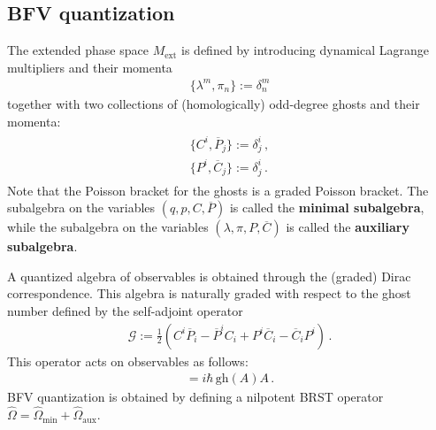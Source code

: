 \subsection{BFV quantization}

    The extended phase space $M_{\text{ext}}$ is defined by introducing dynamical Lagrange multipliers and their momenta
    \begin{gather}
        \{\lambda^m,\pi_n\} := \delta^m_n
    \end{gather}
    together with two collections of (homologically) odd-degree ghosts and their momenta:
    \begin{gather}
        \begin{aligned}
            \{C^i,\overline{P}_j\} := \delta^i_j\,,\\
            \{P^i,\overline{C}_j\} := \delta^i_j\,.
        \end{aligned}
    \end{gather}
    Note that the Poisson bracket for the ghosts is a graded Poisson bracket. The subalgebra on the variables $(q,p,C,\overline{P})$ is called the \textbf{minimal subalgebra}, while the subalgebra on the variables $(\lambda,\pi,P,\overline{C})$ is called the \textbf{auxiliary subalgebra}.

    A quantized algebra of observables is obtained through the (graded) Dirac correspondence. This algebra is naturally graded with respect to the ghost number defined by the self-adjoint operator
    \begin{gather}
        \mathcal{G} := \frac{1}{2}\left(C^i\overline{P}_i - \overline{P}^iC_i + P^i\overline{C}_i - \overline{C}_iP^i\right)\,.
    \end{gather}
    This operator acts on observables as follows:
    \begin{gather}
        [\mathcal{G},A] = i\hbar\,\mathrm{gh}(A)A\,.
    \end{gather}
    BFV quantization is obtained by defining a nilpotent BRST operator $\widehat{\Omega}=\widehat{\Omega}_{\text{min}}+\widehat{\Omega}_{\text{aux}}$.
